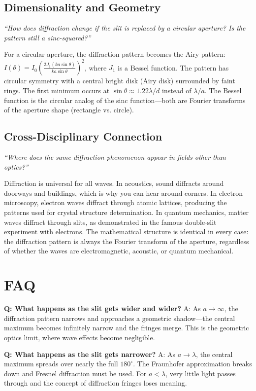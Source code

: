 \documentclass[11pt,openright]{book}
\begin{document}
\subsection*{Dimensionality and Geometry}
\textit{``How does diffraction change if the slit is replaced by a circular aperture? Is the pattern still a sinc-squared?''}

For a circular aperture, the diffraction pattern becomes the Airy pattern: $I(\theta) = I_0\left(\frac{2J_1(ka\sin\theta)}{ka\sin\theta}\right)^2$, where $J_1$ is a Bessel function. The pattern has circular symmetry with a central bright disk (Airy disk) surrounded by faint rings. The first minimum occurs at $\sin\theta \approx 1.22\lambda/d$ instead of $\lambda/a$. The Bessel function is the circular analog of the sinc function---both are Fourier transforms of the aperture shape (rectangle vs. circle).

\subsection*{Cross-Disciplinary Connection}
\textit{``Where does the same diffraction phenomenon appear in fields other than optics?''}

Diffraction is universal for all waves. In acoustics, sound diffracts around doorways and buildings, which is why you can hear around corners. In electron microscopy, electron waves diffract through atomic lattices, producing the patterns used for crystal structure determination. In quantum mechanics, matter waves diffract through slits, as demonstrated in the famous double-slit experiment with electrons. The mathematical structure is identical in every case: the diffraction pattern is always the Fourier transform of the aperture, regardless of whether the waves are electromagnetic, acoustic, or quantum mechanical.

\section*{FAQ}

\textbf{Q: What happens as the slit gets wider and wider?}
A: As $a \to \infty$, the diffraction pattern narrows and approaches a geometric shadow---the central maximum becomes infinitely narrow and the fringes merge. This is the geometric optics limit, where wave effects become negligible.

\textbf{Q: What happens as the slit gets narrower?}
A: As $a \to \lambda$, the central maximum spreads over nearly the full $180^\circ$. The Fraunhofer approximation breaks down and Fresnel diffraction must be used. For $a < \lambda$, very little light passes through and the concept of diffraction fringes loses meaning.
\end{document}
